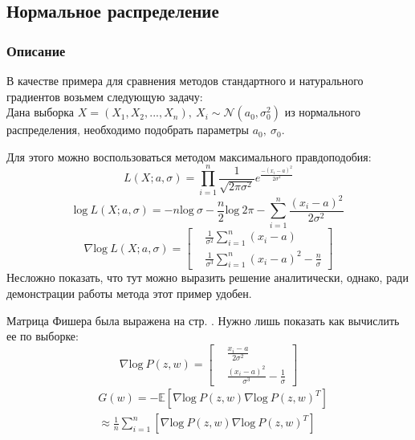 \documentclass[a4paper,12pt]{article}
\begin{document}
\subsection{Нормальное распределение}
\subsubsection{Описание}
        В качестве примера для сравнения методов стандартного и натурального градиентов возьмем следующую задачу: \\ 
        Дана выборка $X = (X_1, X_2, ..., X_n), ~ X_i \sim \mathcal{N}(a_0, \sigma^2_0)$ из нормального распределения, необходимо подобрать параметры $a_0, ~ \sigma_0$.

        Для этого можно воспользоваться методом максимального правдоподобия:
        $$L(X; a, \sigma) = \prod_{i=1}^n \frac{1}{\sqrt{2\pi\sigma^2}}e^{\frac{-(x_i-a)^2}{2\sigma^2}}$$
        $$\mbox{log} ~ L(X; a, \sigma) = -n \mbox{log} ~ \sigma - \frac{n}{2} \mbox{log} ~ 2\pi - \sum_{i=1}^n \frac{(x_i-a)^2}{2\sigma^2}$$
        $$
            \nabla \mbox{log} ~ L(X; a, \sigma) = 
            \left[
                \begin{aligned}
                    & \frac{1}{\sigma^2}\sum_{i=1}^n (x_i - a) \\
                    & \frac{1}{\sigma^3}\sum_{i=1}^n (x_i - a)^2 - \frac{n}{\sigma}
                \end{aligned}
            \right]
        $$
        Несложно показать, что тут можно выразить решение аналитически, однако, ради демонстрации работы метода этот пример удобен.

        Матрица Фишера была выражена на стр. \pageref{FisherMatrix}.
        Нужно лишь показать как вычислить ее по выборке:
        $$
            \nabla \mbox{log} ~ P(z, w) = 
            \left[
                \begin{aligned}
                    & \frac{x_i - a}{2\sigma^2} \\
                    & \frac{(x_i - a)^2}{\sigma^3} - \frac{1}{\sigma}
                \end{aligned}
            \right]
        $$
        $$
            \begin{aligned}
                & G(w) = \mathbb{-E} \left[ \nabla \mbox{log} ~ P(z, w) \nabla \mbox{log} ~ P(z, w)^T \right] \\
                & \approx \frac{1}{n}\sum_{i=1}^n \left[ \nabla \mbox{log} ~ P(z, w) \nabla \mbox{log} ~ P(z, w)^T \right] \\
            \end{aligned}
        $$
\end{document}
